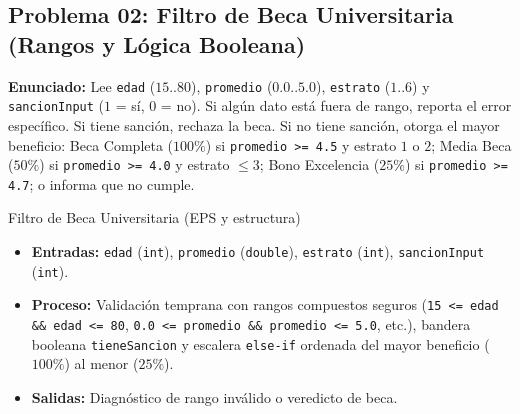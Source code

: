 \documentclass[11pt,letterpaper]{article}
\begin{document}
\subsection{Problema 02: Filtro de Beca Universitaria (Rangos y Lógica Booleana)}

\textbf{Enunciado:} Lee \texttt{edad} ($15..80$), \texttt{promedio} ($0.0..5.0$), \texttt{estrato} ($1..6$) y \texttt{sancionInput} ($1$ = sí, $0$ = no). Si algún dato está fuera de rango, reporta el error específico. Si tiene sanción, rechaza la beca. Si no tiene sanción, otorga el mayor beneficio: Beca Completa ($100\%$) si \texttt{promedio >= 4.5} y estrato $1$ o $2$; Media Beca ($50\%$) si \texttt{promedio >= 4.0} y estrato $\le 3$; Bono Excelencia ($25\%$) si \texttt{promedio >= 4.7}; o informa que no cumple.

\begin{analisis}{Filtro de Beca Universitaria (EPS y estructura)}
\begin{itemize}
  \item \textbf{Entradas:} \texttt{edad} (\texttt{int}), \texttt{promedio} (\texttt{double}), \texttt{estrato} (\texttt{int}), \texttt{sancionInput} (\texttt{int}).
  \item \textbf{Proceso:} Validación temprana con rangos compuestos seguros (\texttt{15 <= edad \&\& edad <= 80}, \texttt{0.0 <= promedio \&\& promedio <= 5.0}, etc.), bandera booleana \texttt{tieneSancion} y escalera \texttt{else-if} ordenada del mayor beneficio ($100\%$) al menor ($25\%$).
  \item \textbf{Salidas:} Diagnóstico de rango inválido o veredicto de beca.
\end{itemize}
\end{analisis}





\end{document}
